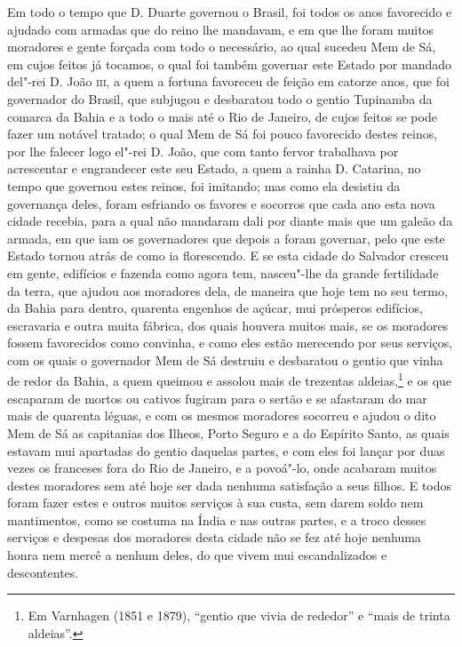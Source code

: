 Em todo o tempo que D. Duarte governou o Brasil, foi todos os anos favorecido e ajudado
com armadas que do reino lhe mandavam, e em que lhe foram muitos moradores e gente forçada
com todo o necessário, ao qual sucedeu Mem de Sá, em cujos feitos já tocamos, o qual foi
também governar este Estado por mandado del"-rei D. João \textsc{iii}, a quem a fortuna
favoreceu de feição em catorze anos, que foi governador do Brasil, que subjugou e
desbaratou todo o gentio Tupinamba da comarca da Bahia e a todo o mais até o Rio de
Janeiro, de cujos feitos se pode fazer um notável tratado; o qual Mem de Sá foi pouco
favorecido destes reinos, por lhe falecer logo el"-rei D. João, que com tanto fervor
trabalhava por acrescentar e engrandecer este seu Estado, a quem a rainha D. Catarina, no
tempo que governou estes reinos, foi imitando; mas como ela desistiu da governança deles,
foram esfriando os favores e socorros que cada ano esta nova cidade recebia, para a qual
não mandaram dali por diante mais que um galeão da armada, em que iam os governadores que
depois a foram governar, pelo que este Estado tornou atrás de como ia florescendo. E se
esta cidade do Salvador cresceu em gente, edifícios e fazenda como agora tem, nasceu"-lhe
da grande fertilidade da terra, que ajudou aos moradores dela, de maneira que hoje tem no
seu termo, da Bahia para dentro, quarenta engenhos de açúcar, mui prósperos edifícios,
escravaria e outra muita fábrica, dos quais houvera muitos mais, se os moradores fossem
favorecidos como convinha, e como eles estão merecendo por seus serviços, com os quais o
governador Mem de Sá destruiu e desbaratou o gentio que vinha de redor da Bahia, a quem
queimou e assolou mais de trezentas aldeias,\footnote{ Em Varnhagen (1851 e 1879),
``gentio que vivia de rededor'' e ``mais de trinta aldeias''.} e os que escaparam de
mortos ou cativos fugiram para o sertão e se afastaram do mar mais de quarenta léguas, e
com os mesmos moradores socorreu e ajudou o dito Mem de Sá as capitanias dos Ilheos, Porto
Seguro e a do Espírito Santo, as quais estavam mui apartadas do gentio daquelas partes, e
com eles foi lançar por duas vezes os franceses fora do Rio de Janeiro, e a povoá"-lo, onde
acabaram muitos destes moradores sem até hoje ser dada nenhuma satisfação a seus filhos. E
todos foram fazer estes e outros muitos serviços à sua custa, sem darem soldo nem
mantimentos, como se costuma na Índia e nas outras partes, e a troco desses serviços e
despesas dos moradores desta cidade não se fez até hoje nenhuma honra nem mercê a nenhum
deles, do que vivem mui escandalizados e descontentes.

